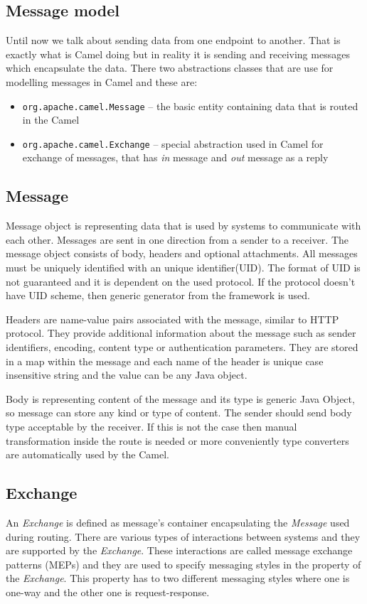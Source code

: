 \documentclass[12pt,final,oneside]{fithesis2}
\begin{document}
\subsection{Message model}
Until now we talk about sending data from one endpoint to another. That is exactly what is Camel doing but in reality it is sending and receiving messages which encapsulate the data. There two abstractions classes that are use for modelling messages in Camel and these are:
\begin{itemize}
\item
\texttt{org.apache.camel.Message} -- the basic entity containing data that is routed in the Camel 

\item
\texttt{org.apache.camel.Exchange} -- special abstraction used in Camel for exchange of messages, that has \textit{in} message and \textit{out} message as a reply

\end{itemize} 

\subsection*{Message}
Message object is representing data that is used by systems to communicate with each other. Messages are sent in one direction from a sender to a receiver. The message object consists of body, headers and optional attachments. All messages must be uniquely identified with an unique identifier(UID). The format of UID is not guaranteed and it is dependent on the used protocol. If the protocol doesn't have UID scheme, then generic generator from the framework is used.

Headers are name-value pairs associated with the message, similar to HTTP protocol. They provide additional information about the message such as sender identifiers, encoding, content type or authentication parameters. They are stored in a map within the message and each name of the header is unique case insensitive string and the value can be any Java object.

Body is representing content of the message and its type is generic Java Object, so message can store any kind or type of content. The sender should send body type acceptable by the receiver. If this is not the case then manual transformation inside the route is needed or more conveniently type converters are automatically used by the Camel.


\subsection*{Exchange}
An \textit{Exchange} is defined as message's container encapsulating the \textit{Message} used during routing. There are various types of interactions between systems and they are supported by the \textit{Exchange}. These interactions are called message exchange patterns (MEPs) and they are used to specify messaging styles in the property of the  \textit{Exchange}. This property has to two different messaging styles where one is one-way and the other one is request-response. 
\end{document}
